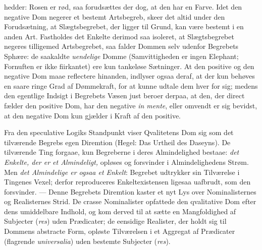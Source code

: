 \documentclass[12pt]{book}
\newcommand{\opage}[1]{\marginnote{\footnotesize\textit{[#1]}}}
\begin{document}
hedder: Rosen er rød, saa forudsættes der dog, at den har en Farve. Idet den
negative Dom negerer et bestemt Artsbegreb, skeer det altid under den
Forudsætning, at Slægtsbegrebet, der ligger til Grund, kan være bestemt i en
anden Art. Fastholdes det Enkelte derimod saa isoleret, at Slægtsbegrebet
negeres tilligemed Artsbegrebet, saa falder Dommen
\opage{49} selv udenfor Begrebets Sphære: de saakaldte \emph{uendelige} Domme
(Samvittigheden er ingen Elephant; Fornuften er ikke fiirkantet) ere kun
tankeløse Sætninger. At den positive og den negative Dom maae reflectere
hinanden, indlyser ogsaa deraf, at der kun behøves en saare ringe Grad af
Dømmekraft, for at kunne udtale dem hver for sig; medens den egentlige Indsigt i
Begrebets Væsen just beroer derpaa, at den, der direct fælder den positive Dom,
har den negative \textit{in mente}, eller omvendt er sig bevidst, at den
negative Dom kun gjælder i Kraft af den positive.

Fra den speculative Logiks Standpunkt viser Qvalitetens Dom sig som det
tilværende Begrebs egen Diremtion (Hegel: Das Urtheil des Daseyns). De
tilværende Ting forgaae, kun Begreberne i deres Almindelighed bestaae: \emph{det
Enkelte, der er et Almindeligt,} opløses og forsvinder i Almindelighedens Strøm.
Men \emph{det Almindelige er ogsaa et Enkelt}: Begrebet udtrykker sin Tilværelse
i Tingenes Vexel; derfor reproduceres Enkeltexistensen ligesaa uafbrudt, som den
forsvinder. --- Denne Begrebets Diremtion kaster et nyt Lys over Nominalisternes
og Realisternes Strid. De crasse Nominalister opfattede den qvalitative Dom
efter dens umiddelbare Indhold, og kom derved til at sætte en Mangfoldighed af
Subjecter (\textit{res}) uden Prædicater; de eensidige Realister, der holdt sig
til Dommens abstracte Form, opløste Tilværelsen i et Aggregat af Prædicater
(flagrende \textit{universalia}) uden bestemte Subjecter (\textit{res}).
\end{document}
